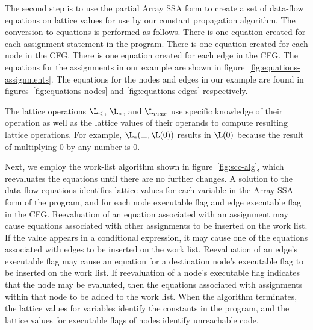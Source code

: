 The second step is to use the partial Array SSA form to create a set of
data-flow equations on lattice values for use by our constant
propagation algorithm.
The conversion to equations is performed as follows.
There is one equation created for each assignment statement in the program.
There is one equation created for each node in the CFG.
There is one equation created for each edge in the CFG.
The equations for the assignments in our example are shown in
figure~\ref{fig:equations-assignments}. 
The equations for the nodes and edges in our example are found in
figures~\ref{fig:equations-nodes} and \ref{fig:equations-edges} respectively.


The lattice operations $\L_{<}$, $\L_{*}$, and
$\L_{max}$ use specific knowledge of their operation as well as the
lattice values of their operands to compute resulting lattice
operations. For example, $\L_{*}(\bot,\L(0))$ results in $\L(0)$
because the result of multiplying 0 by any number is 0.  




Next, we employ the work-list algorithm shown in figure~\ref{fig:scc-alg}, 
which reevaluates the equations until there are no further
changes.  A solution to the data-flow equations identifies
lattice values for each variable in the Array SSA form of the program, and for each node executable flag and
edge executable flag in the CFG.
Reevaluation of an equation associated with an
assignment may cause equations associated with other assignments to be
inserted on the work list. If the value appears in a conditional
expression, it may cause one of the equations associated with edges to
be inserted on the work list. Reevaluation of an edge's executable
flag may cause an equation
for a destination node's executable flag to
be inserted on the work list. If reevaluation of a node's executable flag indicates that
the node may be evaluated, then the equations associated with
assignments within that node to be added to the work list.
When the algorithm terminates, the lattice values for variables identify
the constants in the program, and  the lattice values for executable
flags of nodes identify
unreachable code.


